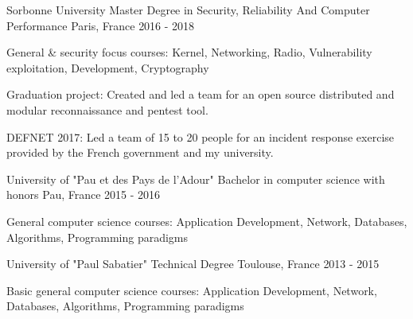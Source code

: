 

\begin{cventries}

  \cventry
    {Sorbonne University} %
    {Master Degree in Security, Reliability And Computer Performance } %
    {Paris, France} %
    {2016 - 2018} %
    {
      \begin{cvitems} %
        \item {General \& security focus courses: Kernel, Networking, Radio, Vulnerability exploitation, Development, Cryptography}
        \item {Graduation project: Created and led a team for an open source distributed and modular reconnaissance and pentest tool.}
        \item {DEFNET 2017: Led a team of 15 to 20 people for an incident response exercise provided by the French government and my university.}
      \end{cvitems}
    }

  \cventry
    {University of "Pau et des Pays de l'Adour"} %
    {Bachelor in computer science with honors } %
    {Pau, France} %
    {2015 - 2016} %
    {
      \begin{cvitems}
        \item {General computer science courses: Application Development, Network, Databases, Algorithms, Programming paradigms}
      \end{cvitems}
    }

  \cventry
    {University of "Paul Sabatier"} %
    {Technical Degree} %
    {Toulouse, France} %
    {2013 - 2015} %
    {
      \begin{cvitems}
        \item {Basic general computer science courses: Application Development, Network, Databases, Algorithms, Programming paradigms}
      \end{cvitems}
    }

\end{cventries}
